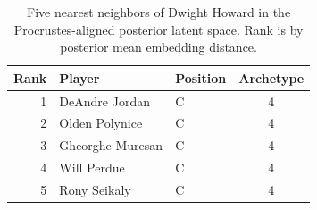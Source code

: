 \begin{table}[htbp]
  \centering\small
  \begin{tabular}{rllc}
    \toprule
    Rank & Player & Position & Archetype \\
    \midrule
    1 & DeAndre Jordan & C & 4 \\
    2 & Olden Polynice & C & 4 \\
    3 & Gheorghe Muresan & C & 4 \\
    4 & Will Perdue & C & 4 \\
    5 & Rony Seikaly & C & 4 \\
    \bottomrule
  \end{tabular}
  \caption{Five nearest neighbors of Dwight Howard in the Procrustes-aligned posterior latent space. Rank is by posterior mean embedding distance.}
  \label{tab:Dwight_Howard_neighbors}
\end{table}

